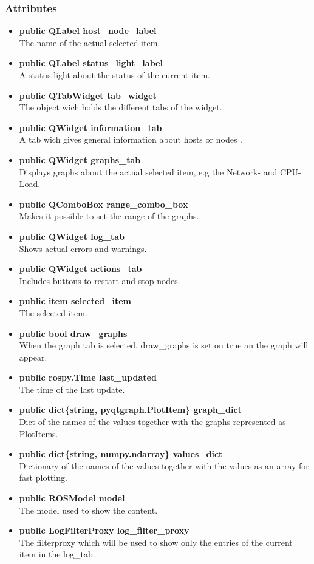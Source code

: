 \subsubsection{Attributes}
\begin{itemize}
  \item \textbf{public QLabel host\_node\_label}\\
  The name of the actual selected item.
  \item \textbf{public QLabel status\_light\_label}\\
  A status-light about the status of the current item.
  \item \textbf{public QTabWidget tab\_widget}\\
  The object wich holds the different tabs of the widget.
  \item \textbf{public QWidget information\_tab}\\
  A tab wich gives general information about hosts or nodes .
  \item \textbf{public QWidget graphs\_tab}\\
  Displays graphs about the actual selected item, e.g the Network- and
  CPU-Load.
  \item \textbf{public QComboBox range\_combo\_box}\\
  Makes it possible to set the range of the graphs.
  \item \textbf{public QWidget log\_tab}\\
  Shows actual errors and warnings.
  \item \textbf{public QWidget actions\_tab}\\
  Includes buttons to restart and stop nodes.
  \item \textbf{public item selected\_item}\\
  The selected item.
  \item \textbf{public bool draw\_graphs}\\
  When the graph tab is selected, draw\_graphs is set on true an the graph will
  appear.
  \item \textbf{public rospy.Time last\_updated}\\
  The time of the last update.
  \item \textbf{public dict\{string, pyqtgraph.PlotItem\} graph\_dict}\\
  Dict of the names of the values together with the graphs represented as PlotItems.
  \item \textbf{public dict\{string, numpy.ndarray\} values\_dict}\\
  Dictionary of the names of the values together with the values as an array for fast plotting.
  \item \textbf{public ROSModel model}\\
  The model used to show the content.
  \item \textbf{public LogFilterProxy log\_filter\_proxy}\\
  The filterproxy which will be used to show only the entries of the current item in the log\_tab.
  
\end{itemize}
